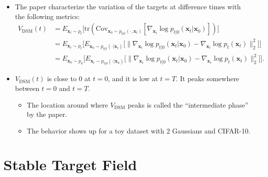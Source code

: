 \documentclass[10pt]{article}
\newcommand{\Cov}{\mathrm{Cov}}
\newcommand{\ve}[1]{\mathbf{#1}}
\newcommand{\mrm}[1]{\mathrm{#1}}
\newcommand{\tr}{\mathrm{tr}}
\begin{document}
\begin{itemize}
  \item The paper characterize the variation of the targets at difference times with the following metrics:
  \begin{align*}
    V_{\mrm{DSM}}(t) 
    &= E_{\ve{x}_t \sim p_t} \big[ \tr(\Cov_{\ve{x}_0 \sim p_{0|t}(\cdot, \ve{x}_t)} [\nabla_{\ve{x}_t} \log p_{t|0}(\ve{x}_t|\ve{x}_0)]) \big] \\
    &= E_{\ve{x}_t \sim p_t} \Big[ E_{\ve{x}_0 \sim p_{0|t}(\cdot|\ve{x}_t)} \big[ \| \nabla_{\ve{x}_t} \log p_{t|0}(\ve{x}_t|\ve{x}_0) - \nabla_{\ve{x}_t} \log p_t(\ve{x}_t) \|_2^2 \big] \Big] \\
    &= E_{\ve{x}_0 \sim p_0} \Big[ E_{\ve{x}_t \sim p_{t|0}(\cdot|\ve{x}_0)} \big[ \| \nabla_{\ve{x}_t} \log p_{t|0}(\ve{x}_t|\ve{x}_0) - \nabla_{\ve{x}_t} \log p_t(\ve{x}_t) \|_2^2 \big] \Big].
  \end{align*}

  \item $V_{\mrm{DSM}}(t)$ is close to $0$ at $t = 0$, and it is low at $t = T$. It peaks somewhere between $t = 0$ and $t = T$.
  \begin{itemize}
    \item The location around where $V_{\mrm{DSM}}$ peaks is called the ``intermediate phase'' by the paper.
    \item The behavior shows up for a toy dataset with 2 Gaussians and CIFAR-10.
  \end{itemize}
\end{itemize}

\section{Stable Target Field}
\end{document}
